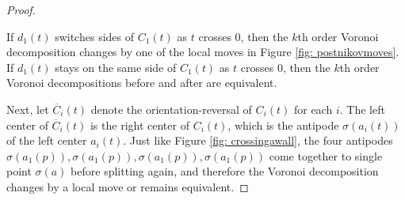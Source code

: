 \documentclass[11pt,oneside]{amsart}
\theoremstyle{definition}
\theoremstyle{remark}
\numberwithin{equation}{section}
\begin{document}
\begin{proof}
\begin{itemize}
\end{itemize}

If $d_1(t)$ switches sides of $C_1(t)$ as $t$ crosses $0$, then the $k$th order Voronoi decomposition changes by one of the local moves in Figure \ref{fig: postnikovmoves}. If $d_1(t)$ stays on the same side of $C_1(t)$ as $t$ crosses $0$, then the $k$th order Voronoi decompositions before and after are equivalent.


Next, let $\overline{C}_i(t)$ denote the orientation-reversal of $C_i(t)$ for each $i$. The left center of $\overline{C}_i(t)$ is the right center of $C_i(t)$, which is the antipode $\sigma(a_i(t))$ of the left center $a_i(t)$. Just like Figure \ref{fig: crossingawall}, the four antipodes $\sigma(a_1(p)),\sigma(a_1(p)),\sigma(a_1(p)),\sigma(a_1(p))$ come together to single point $\sigma(a)$ before splitting again, and therefore the Voronoi decomposition changes by a local move or remains equivalent.


\end{proof}
\end{document}
